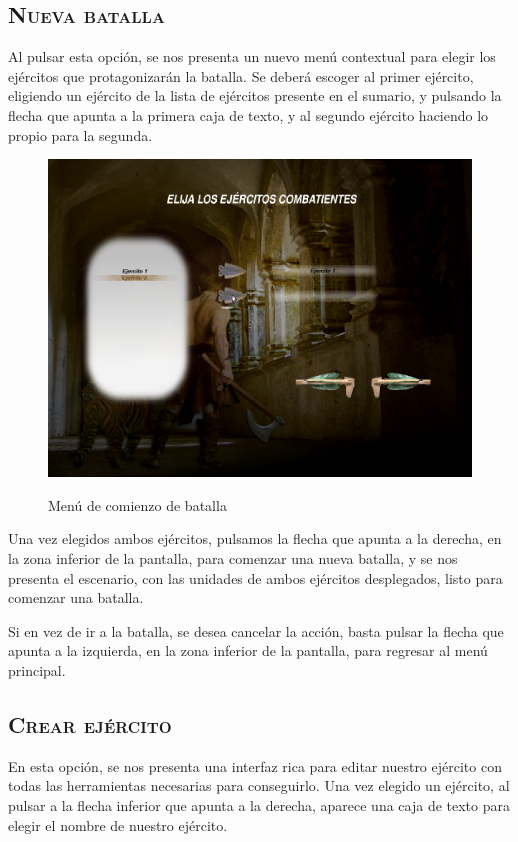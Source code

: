 \subsection*{\textsc{Nueva batalla}}
Al pulsar esta opción, se nos presenta un nuevo menú contextual para
elegir los ejércitos que protagonizarán la batalla. Se deberá escoger
al primer ejército, eligiendo un ejército de la lista de ejércitos
presente en el sumario, y pulsando la flecha que apunta a la primera
caja de texto, y al segundo ejército haciendo lo propio para la
segunda.

\begin{figure}[h]
\centering
\includegraphics[scale=.4]{./imagenes/comenzarcombate.png}
\label{fig:comenzarcombate}
\caption{Menú de comienzo de batalla}
\end{figure}

Una vez elegidos ambos ejércitos, pulsamos la flecha que apunta a la
derecha, en la zona inferior de la pantalla, para comenzar una nueva
batalla, y se nos presenta el
escenario, con las unidades de ambos ejércitos desplegados, listo para
comenzar una batalla.

Si en vez de ir a la batalla, se desea cancelar la acción, basta
pulsar la flecha que apunta a la izquierda, en la zona inferior de la
pantalla, para regresar al menú principal.

\subsection*{\textsc{Crear ejército}}
En esta opción, se nos presenta una interfaz rica para editar nuestro
ejército con todas las herramientas necesarias para conseguirlo. Una
vez elegido un ejército, al pulsar a la flecha inferior que apunta a
la derecha, aparece una caja de texto para elegir el nombre de nuestro
ejército.

